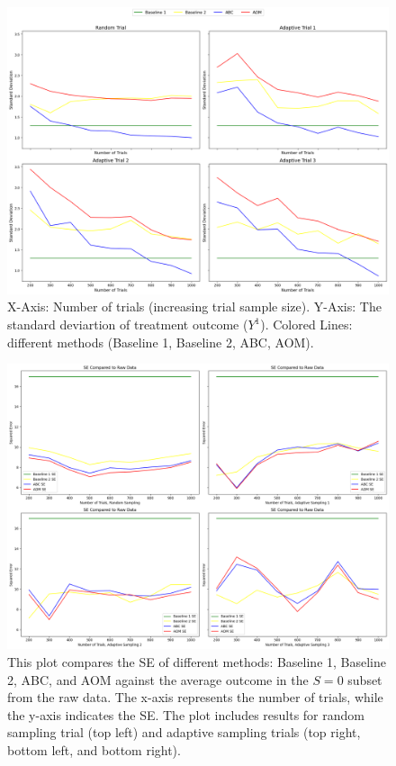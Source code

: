 \documentclass[12pt, oneside]{amsart}
\theoremstyle{definition}
\theoremstyle{remark}
\numberwithin{equation}{section}
\begin{document}
\begin{figure}[hbt!]
    \centering
    \includegraphics[scale=0.15]{Report/Figure/variance.jpg}
    \caption{X-Axis: Number of trials (increasing trial sample size). Y-Axis: The standard deviartion of treatment outcome ($Y^1$). Colored Lines: different methods (Baseline 1, Baseline 2, ABC, AOM).}
    \label{variance}
\end{figure}
\FloatBarrier


\begin{figure}[hbt!]
    \centering
    \includegraphics[scale=0.15]{Report/Figure/se_raw.jpg}
    \caption{This plot compares the SE of different methods: Baseline 1, Baseline 2, ABC, and AOM against the average outcome in the $S = 0$ subset from the raw data. The x-axis represents the number of trials, while the y-axis indicates the SE. The plot includes results for random sampling trial (top left) and adaptive sampling trials (top right, bottom left, and bottom right).}
    \label{se_raw}
\end{figure}
\FloatBarrier
\end{document}
